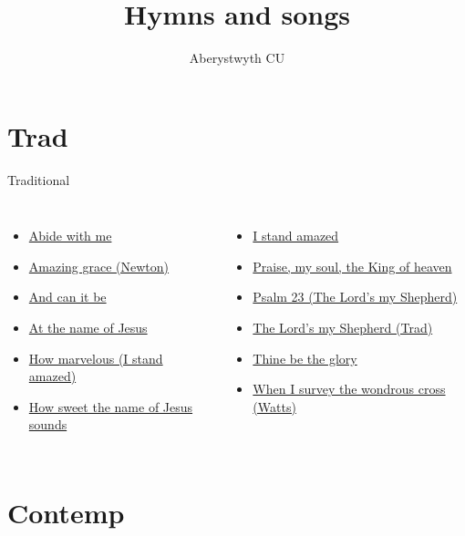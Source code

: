 \documentclass{beamer}
\title{Hymns and songs}
\author{Aberystwyth CU}
\date{}
\begin{document}
\maketitle
\section{Trad}

\begin{frame}{Traditional}
\begin{columns}
    \begin{itemize}
    \item \hyperlink{Abide with me[]1}{Abide with me }
    \item \hyperlink{Amazing grace[](Newton)1}{Amazing grace (Newton)}
    \item \hyperlink{And can it be[]1}{And can it be }
    \item \hyperlink{At the name of Jesus[]1}{At the name of Jesus }
    \item \hyperlink{I stand amazed['How marvelous']1}{How marvelous (I stand amazed)}
    \item \hyperlink{How sweet the name of Jesus sounds[]1}{How sweet the name of Jesus sounds }
\end{itemize}
    \begin{itemize}
    \item \hyperlink{I stand amazed['How marvelous']1}{I stand amazed }
    \item \hyperlink{Praise, my soul, the King of heaven[]1}{Praise, my soul, the King of heaven }
    \item \hyperlink{The Lord's my Shepherd['Psalm 23'](Trad)1}{Psalm 23 (The Lord's my Shepherd)}
    \item \hyperlink{The Lord's my Shepherd['Psalm 23'](Trad)1}{The Lord's my Shepherd (Trad)}
    \item \hyperlink{Thine be the glory[]1}{Thine be the glory }
    \item \hyperlink{When I survey the wondrous cross[](Watts)1}{When I survey the wondrous cross (Watts)}
\end{itemize}


\end{columns}

\end{frame}
\section{Contemp}
\end{document}
